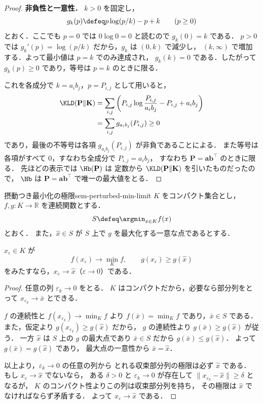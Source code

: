 \begin{proof}
  \textbf{非負性と一意性．}
  $k > 0$ を固定し，
  \[
    g_k(p) \defeq p\log(p/k) - p + k \qquad (p \geq 0)
  \]
  とおく．ここでも $p=0$ では $0\log0=0$ と読むので $g_k(0)=k$ である．
  $p>0$ では $g_k'(p)=\log(p/k)$ だから，$g_k$ は $(0,k)$ で減少し，
  $(k,\infty)$ で増加する．よって最小値は $p=k$ でのみ達成され，
  $g_k(k)=0$ である．したがって $g_k(p)\geq0$ であり，等号は $p=k$ のときに限る．

  これを各成分で $k=a_i b_j$，$p=P_{i,j}$ として用いると，
  \[
  \begin{aligned}
    \KLD(\mathbf{P}\|\mathbf{K})
    &=
    \sum_{i,j}
    \left(
      P_{i,j}\log\frac{P_{i,j}}{a_i b_j}
      - P_{i,j}
      + a_i b_j
    \right) \\
    &=
    \sum_{i,j} g_{a_i b_j}(P_{i,j})
    \geq 0
  \end{aligned}
  \]
  であり，最後の不等号は各項 $g_{a_i b_j}(P_{i,j})$ が非負であることによる．
  また等号は各項がすべて $0$，すなわち全成分で $P_{i,j}=a_i b_j$，
  すなわち $\mathbf{P}=\mathbf{a}\mathbf{b}^\top$ のときに限る．
  先ほどの表示では $\Hb(\mathbf{P})$ は
  定数から $\KLD(\mathbf{P}\|\mathbf{K})$ を引いたものだったので，
  $\Hb$ は $\mathbf{P} = \mathbf{a}\mathbf{b}^\top$ で唯一の最大値をとる．
\end{proof}

\begin{lemma}{摂動つき最小化の極限}{sem-perturbed-min-limit}
  $K$ をコンパクト集合とし，$f, g \colon K \to \mathbb{R}$ を連続関数とする．
  \[
    S \defeq \argmin_{x \in K} f(x)
  \]
  とおく．
  また，$\hat{x} \in S$ が $S$ 上で $g$ を最大化する一意な点であるとする．

  $x_\varepsilon \in K$ が
  \[
    f(x_\varepsilon) \to \min_K f,
    \qquad
    g(x_\varepsilon) \geq g(\hat{x})
  \]
  をみたすなら，$x_\varepsilon \to \hat{x}$（$\varepsilon \to 0$）である．
\end{lemma}

\begin{proof}
  任意の列 $\varepsilon_k \to 0$ をとる．
  $K$ はコンパクトだから，必要なら部分列をとって
  $x_{\varepsilon_k} \to \bar{x}$ とできる．

  $f$ の連続性と $f(x_{\varepsilon_k}) \to \min_K f$ より
  $f(\bar{x}) = \min_K f$ であり，$\bar{x} \in S$ である．
  また，仮定より $g(x_{\varepsilon_k}) \geq g(\hat{x})$ だから，
  $g$ の連続性より $g(\bar{x}) \geq g(\hat{x})$ が従う．
  一方 $\hat{x}$ は $S$ 上の $g$ の最大点であり $\bar{x} \in S$ だから
  $g(\bar{x}) \leq g(\hat{x})$．
  よって $g(\bar{x}) = g(\hat{x})$ であり，
  最大点の一意性から $\bar{x} = \hat{x}$．

  以上より，$\varepsilon_k \to 0$ の任意の列から
  とれる収束部分列の極限は必ず $\hat{x}$ である．
  もし $x_\varepsilon \to \hat{x}$ でないなら，
  ある $\delta > 0$ と $\varepsilon_k \to 0$ が存在して
  $\|x_{\varepsilon_k} - \hat{x}\| \geq \delta$ となるが，
  $K$ のコンパクト性よりこの列は収束部分列を持ち，
  その極限は $\hat{x}$ でなければならず矛盾する．
  よって $x_\varepsilon \to \hat{x}$ である．
\end{proof}

